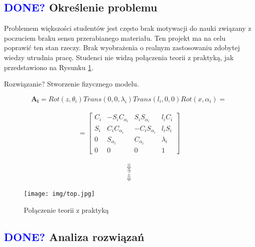 \documentclass[11pt,titlepage,a4paper]{article}
\begin{document}
\subsection{\textcolor{blue}{DONE?} Określenie problemu}

Problemem większości studentów jest często brak motywacji do nauki związany z poczuciem braku sensu przerabianego materiału. Ten projekt ma na celu poprawić ten stan rzeczy.
Brak wyobrażenia o realnym zastosowaniu zdobytej wiedzy utrudnia pracę. Studenci nie widzą połączenia teorii z praktyką, jak przedstawiono na Rysunku \ref{teoriaVSprakrtyka}.

Rozwiązanie? Stworzenie fizycznego modelu.

\begin{figure}[h!]
    $$\boldsymbol{A_i}=Rot(z,\theta_i)Trans(0,0,\lambda_i)Trans(l_i,0,0)Rot(x,\alpha_i)=$$
    \\
    $$=\begin{bmatrix}
            C_i & -S_i C_{\alpha_i} & S_i S_{\alpha_i}  & l_i C_i   \\
            S_i & C_i C_{\alpha_i}  & -C_i S_{\alpha_i} & l_i S_i   \\
            0   & S_{\alpha_i}      & C_{\alpha_i}      & \lambda_i \\
            0   & 0                 & 0                 & 1
        \end{bmatrix}$$\cite{skryptPR}
    \\
    $$\Downarrow$$
    $$\mathord{?}$$
    $$\Downarrow$$
    \begin{center}
        \texttt{[image: img/top.jpg]}
    \end{center}
    \caption{Połączenie teorii z praktyką}
    \label{teoriaVSprakrtyka}
\end{figure}

\subsection{\textcolor{blue}{DONE?} Analiza rozwiązań}
\end{document}

